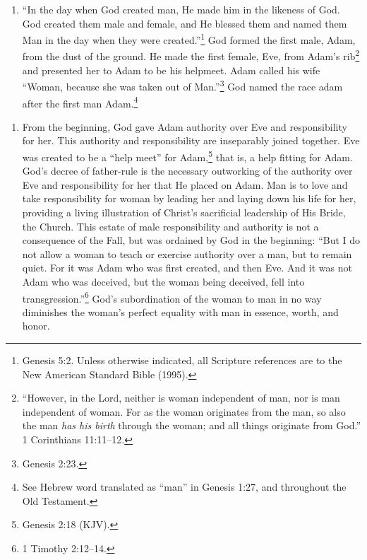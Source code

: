 \documentclass[
]{book}
\providecommand{\tightlist}{%
  \setlength{\itemsep}{0pt}\setlength{\parskip}{0pt}}
\begin{document}
\begin{enumerate}
\def\labelenumi{\arabic{enumi}.}
\tightlist
\item
  ``In the day when God created man, He made him in the likeness of God. God created them male and female, and He blessed them and named them Man in the day when they were created.''\footnote{Genesis 5:2. Unless otherwise indicated, all Scripture references are to the New American Standard Bible (1995).} God formed the first male, Adam, from the dust of the ground. He made the first female, Eve, from Adam's rib\footnote{``However, in the Lord, neither is woman independent of man, nor is man independent of woman. For as the woman originates from the man, so also the man \emph{has his birth} through the woman; and all things originate from God.'' 1 Corinthians 11:11--12.} and presented her to Adam to be his helpmeet. Adam called his wife ``Woman, because she was taken out of Man.''\footnote{Genesis 2:23.} God named the race adam after the first man Adam.\footnote{See Hebrew word translated as ``man'' in Genesis 1:27, and throughout the Old Testament.}
\end{enumerate}

\begin{enumerate}
\def\labelenumi{\arabic{enumi}.}
\setcounter{enumi}{1}
\tightlist
\item
  From the beginning, God gave Adam authority over Eve and responsibility for her. This authority and responsibility are inseparably joined together. Eve was created to be a ``help meet'' for Adam,\footnote{Genesis 2:18 (KJV).} that is, a help fitting for Adam. God's decree of father-rule is the necessary outworking of the authority over Eve and responsibility for her that He placed on Adam. Man is to love and take responsibility for woman by leading her and laying down his life for her, providing a living illustration of Christ's sacrificial leadership of His Bride, the Church. This estate of male responsibility and authority is not a consequence of the Fall, but was ordained by God in the beginning: ``But I do not allow a woman to teach or exercise authority over a man, but to remain quiet. For it was Adam who was first created, and then Eve. And it was not Adam who was deceived, but the woman being deceived, fell into transgression.''\footnote{1 Timothy 2:12--14.} God's subordination of the woman to man in no way diminishes the woman's perfect equality with man in essence, worth, and honor.
\end{enumerate}
\end{document}
